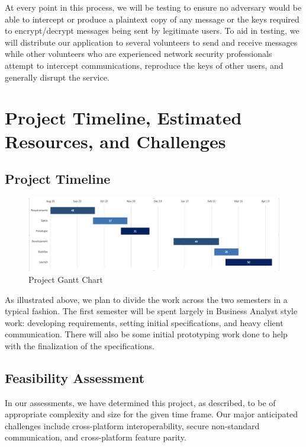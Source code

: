 \documentclass[11pt]{article}
\begin{document}
At every point in this process, we will be testing to ensure no adversary would be able to intercept or produce a plaintext copy of any message or the keys required to encrypt/decrypt messages being sent by legitimate users. To aid in testing, we will distribute our application to several volunteers to send and receive messages while other volunteers who are experienced network security professionals attempt to intercept communications, reproduce the keys of other users, and generally disrupt the service. 

\newpage
\section{Project Timeline, Estimated Resources, and Challenges}
\subsection{Project Timeline}
\begin{figure}[h!]
  \includegraphics[width=\linewidth]{gantt_chart.png}
  \caption{Project Gantt Chart}
  \label{fig:gantt_chart}
\end{figure}

As illustrated above, we plan to divide the work across the two semesters in a typical fashion. The first semester will be spent largely in Business Analyst style work: developing requirements, setting initial specifications, and heavy client communication. There will also be some initial prototyping work done to help with the finalization of the specifications.

\subsection{Feasibility Assessment}
In our assessments, we have determined this project, as described, to be of appropriate complexity and size for the given time frame. Our major anticipated challenges include cross-platform interoperability, secure non-standard communication, and cross-platform feature parity.
\end{document}
